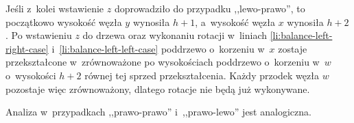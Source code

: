 Jeśli z~kolei wstawienie $z$ doprowadziło do przypadku ,,lewo-prawo'', to początkowo wysokość węzła $y$ wynosiła $h+1$, a~wysokość węzła $x$ wynosiła $h+2$.
Po wstawieniu $z$ do drzewa oraz wykonaniu rotacji w~liniach \ref{li:balance-left-right-case} i~\ref{li:balance-left-left-case} poddrzewo o~korzeniu w~$x$ zostaje przekształcone w~zrównoważone po wysokościach poddrzewo o~korzeniu w~$w$ o~wysokości $h+2$ równej tej sprzed przekształcenia.
Każdy przodek węzła $w$ pozostaje więc zrównoważony, dlatego rotacje nie będą już wykonywane.

Analiza w~przypadkach ,,prawo-prawo'' i~,,prawo-lewo'' jest analogiczna.
